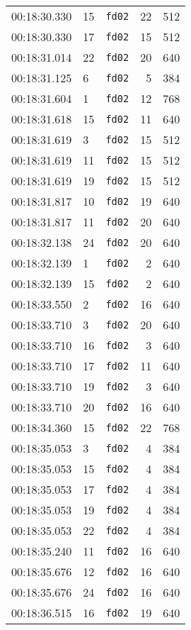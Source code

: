 \documentclass{article}
\begin{document}
\begin{longtable}{lllrr}
00:18:30.330 & 15 & \texttt{fd02} & 22 & 512 \\
00:18:30.330 & 17 & \texttt{fd02} & 15 & 512 \\
00:18:31.014 & 22 & \texttt{fd02} & 20 & 640 \\
00:18:31.125 & 6 & \texttt{fd02} & 5 & 384 \\
00:18:31.604 & 1 & \texttt{fd02} & 12 & 768 \\
00:18:31.618 & 15 & \texttt{fd02} & 11 & 640 \\
00:18:31.619 & 3 & \texttt{fd02} & 15 & 512 \\
00:18:31.619 & 11 & \texttt{fd02} & 15 & 512 \\
00:18:31.619 & 19 & \texttt{fd02} & 15 & 512 \\
00:18:31.817 & 10 & \texttt{fd02} & 19 & 640 \\
00:18:31.817 & 11 & \texttt{fd02} & 20 & 640 \\
00:18:32.138 & 24 & \texttt{fd02} & 20 & 640 \\
00:18:32.139 & 1 & \texttt{fd02} & 2 & 640 \\
00:18:32.139 & 15 & \texttt{fd02} & 2 & 640 \\
00:18:33.550 & 2 & \texttt{fd02} & 16 & 640 \\
00:18:33.710 & 3 & \texttt{fd02} & 20 & 640 \\
00:18:33.710 & 16 & \texttt{fd02} & 3 & 640 \\
00:18:33.710 & 17 & \texttt{fd02} & 11 & 640 \\
00:18:33.710 & 19 & \texttt{fd02} & 3 & 640 \\
00:18:33.710 & 20 & \texttt{fd02} & 16 & 640 \\
00:18:34.360 & 15 & \texttt{fd02} & 22 & 768 \\
00:18:35.053 & 3 & \texttt{fd02} & 4 & 384 \\
00:18:35.053 & 15 & \texttt{fd02} & 4 & 384 \\
00:18:35.053 & 17 & \texttt{fd02} & 4 & 384 \\
00:18:35.053 & 19 & \texttt{fd02} & 4 & 384 \\
00:18:35.053 & 22 & \texttt{fd02} & 4 & 384 \\
00:18:35.240 & 11 & \texttt{fd02} & 16 & 640 \\
00:18:35.676 & 12 & \texttt{fd02} & 16 & 640 \\
00:18:35.676 & 24 & \texttt{fd02} & 16 & 640 \\
00:18:36.515 & 16 & \texttt{fd02} & 19 & 640 \\

\end{longtable}
\end{document}
